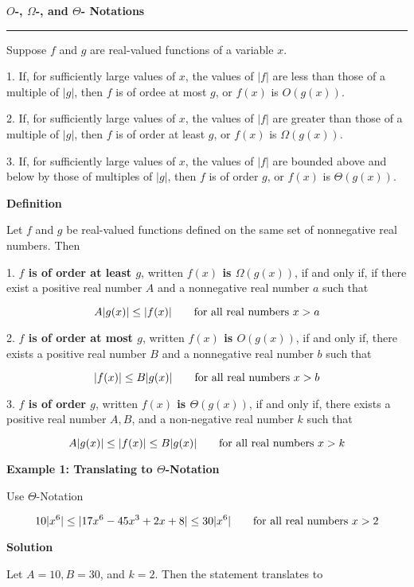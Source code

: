 {\bf $O$-, $\Omega$-, and $\Theta$- Notations}
\vskip 1mm
\hrule

\vskip 1cm
Suppose $f$ and $g$ are real-valued functions of a variable $x$.

\vskip 3mm
1. If, for sufficiently large values of $x$, the values of $|f|$ are less than those of a multiple of $|g|$, then $f$ is of ordee at most $g$, or $f(x)$ is $O(g(x))$.

\vskip 3mm
2. If, for sufficiently large values of $x$, the values of $|f|$ are greater than those of a multiple of $|g|$, then $f$ is of order at least $g$, or $f(x)$ is $\Omega(g(x))$.

\vskip 3mm
3. If, for sufficiently large values of $x$, the values of $|f|$ are bounded above and below by those of multiples of $|g|$, then $f$ is of order $g$, or $f(x)$ is $\Theta(g(x))$.

\vskip 3mm
{\bf Definition}

\vskip 1mm
Let $f$ and $g$ be real-valued functions defined on the same set of nonnegative real numbers. Then

\vskip 3mm
1. {\bf $f$ is of order at least $g$}, written {\bf $f(x)$ is $\Omega(g(x))$}, if and only if, if there exist a positive real number $A$ and a nonnegative real number $a$ such that

$$A|g(x)|\leq |f(x)|\qquad\hbox{for all real numbers $x>a$}$$

\vskip 3mm
2. {\bf $f$ is of order at most $g$}, written {\bf $f(x)$ is $O(g(x))$}, if and only if, there exists a positive real number $B$ and a nonnegative real number $b$ such that

$$|f(x)|\leq B|g(x)|\qquad\hbox{for all real numbers $x>b$}$$

\vskip 3mm
3. {\bf $f$ is of order $g$}, written {\bf $f(x)$ is $\Theta(g(x))$}, if and only if, there exists a positive real number $A,B$, and a non-negative real number $k$ such that

$$A|g(x)|\leq|f(x)|\leq B|g(x)|\qquad\hbox{for all real numbers $x>k$}$$

\filbreak
\vskip 1cm
{\bf Example 1: Translating to $\Theta$-Notation}

\vskip 1mm
Use $\Theta$-Notation

$$10|x^6|\leq |17x^6-45x^3+2x+8|\leq 30|x^6|\qquad\hbox{for all real numbers $x>2$}$$

\vskip 3mm
{\bf Solution}

\vskip 1mm
Let $A=10,B=30$, and $k=2$. Then the statement translates to

